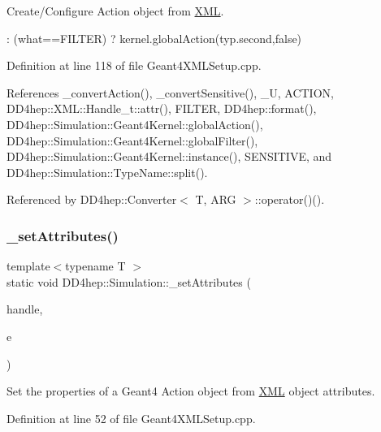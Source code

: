 Create/\+Configure Action object from \hyperlink{namespace_d_d4hep_1_1_x_m_l}{X\+ML}. 

\+: (what==F\+I\+L\+T\+ER) ? kernel.\+global\+Action(typ.\+second,false) 

Definition at line 118 of file Geant4\+X\+M\+L\+Setup.\+cpp.



References \+\_\+convert\+Action(), \+\_\+convert\+Sensitive(), \+\_\+U, A\+C\+T\+I\+ON, D\+D4hep\+::\+X\+M\+L\+::\+Handle\+\_\+t\+::attr(), F\+I\+L\+T\+ER, D\+D4hep\+::format(), D\+D4hep\+::\+Simulation\+::\+Geant4\+Kernel\+::global\+Action(), D\+D4hep\+::\+Simulation\+::\+Geant4\+Kernel\+::global\+Filter(), D\+D4hep\+::\+Simulation\+::\+Geant4\+Kernel\+::instance(), S\+E\+N\+S\+I\+T\+I\+VE, and D\+D4hep\+::\+Simulation\+::\+Type\+Name\+::split().



Referenced by D\+D4hep\+::\+Converter$<$ T, A\+R\+G $>$\+::operator()().

\hypertarget{namespace_d_d4hep_1_1_simulation_a21b5b5f940b68d7c063536de13591e84}{}\label{namespace_d_d4hep_1_1_simulation_a21b5b5f940b68d7c063536de13591e84} 
\subsubsection{\texorpdfstring{\+\_\+set\+Attributes()}{\_setAttributes()}}
{\footnotesize\ttfamily template$<$typename T $>$ \\
static void D\+D4hep\+::\+Simulation\+::\+\_\+set\+Attributes (\begin{DoxyParamCaption}\item[{const \hyperlink{class_t}{T} \&}]{handle,  }\item[{\hyperlink{_det_factory_helper_8h_ac13b3c79d2bc9214ff0cf5b8dc43dda6}{xml\+\_\+h} \&}]{e }\end{DoxyParamCaption})\hspace{0.3cm}{\ttfamily [static]}}



Set the properties of a Geant4 Action object from \hyperlink{namespace_d_d4hep_1_1_x_m_l}{X\+ML} object attributes. 



Definition at line 52 of file Geant4\+X\+M\+L\+Setup.\+cpp.



